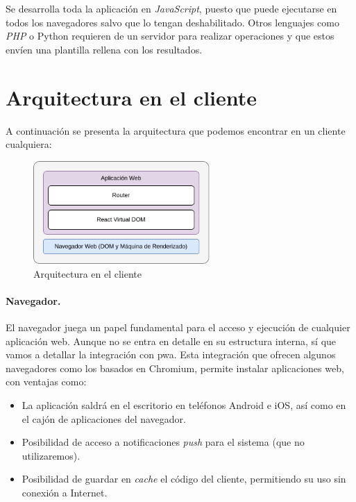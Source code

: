 Se desarrolla toda la aplicación en \textit{JavaScript}, puesto que puede ejecutarse en todos los navegadores salvo que lo tengan deshabilitado. Otros lenguajes como \textit{PHP} o Python requieren de un servidor para realizar operaciones y que estos envíen una plantilla rellena con los resultados.



\section{Arquitectura en el cliente}

A continuación se presenta la arquitectura que podemos encontrar en un cliente cualquiera:

\begin{figure}[H]
	\centering
	\includegraphics[width=0.6\textwidth]{img/client.png}
	\caption{Arquitectura en el cliente}
	\label{fig:chap4:architecture_client}
\end{figure}

\paragraph{Navegador.} El navegador juega un papel fundamental para el acceso y ejecución de cualquier aplicación web. Aunque no se entra en detalle en su estructura interna, sí que vamos a detallar la integración con \acrfull{pwa}. Esta integración que ofrecen algunos navegadores como los basados en Chromium, permite instalar aplicaciones web, con ventajas como:

\begin{itemize}
	\item La aplicación saldrá en el escritorio en teléfonos Android e iOS, así como en el cajón de aplicaciones del navegador.
	\item Posibilidad de acceso a notificaciones \textit{push} para el sistema (que no utilizaremos).
	\item Posibilidad de guardar en \textit{cache} el código del cliente, permitiendo su uso sin conexión a Internet.
\end{itemize}

